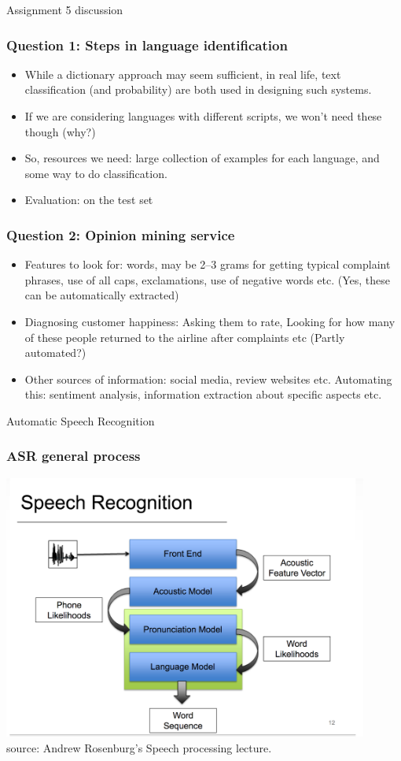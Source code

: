 \documentclass{beamer}
\begin{document}
\begin{frame}
\Large Assignment 5 discussion
\end{frame}

\begin{frame}
\frametitle{Question 1: Steps in language identification}
\begin{itemize}
\item While a dictionary approach may seem sufficient, in real life, text classification (and probability) are both used in designing such systems.
\item If we are considering languages with different scripts, we won't need these though (why?) \pause
\item So, resources we need: large collection of examples for each language, and some way to do classification.
\item Evaluation: on the test set
\end{itemize}
\end{frame}

\begin{frame}
\frametitle{Question 2: Opinion mining service}
\begin{itemize}
\item Features to look for: words, may be 2--3 grams for getting typical complaint phrases, use of all caps, exclamations, use of negative words etc. (Yes, these can be automatically extracted) \pause
\item Diagnosing customer happiness: Asking them to rate, Looking for how many of these people returned to the airline after complaints etc (Partly automated?) \pause
\item Other sources of information: social media, review websites etc. Automating this: sentiment analysis, information extraction about specific aspects etc. 
\end{itemize}
\end{frame}

\begin{frame}
\Large Automatic Speech Recognition
\end{frame}

\begin{frame}
\frametitle{ASR general process}
\includegraphics[width=0.9\textwidth]{asr.png}
\\ \tiny source: Andrew Rosenburg's Speech processing lecture.
\end{frame}
\end{document}
